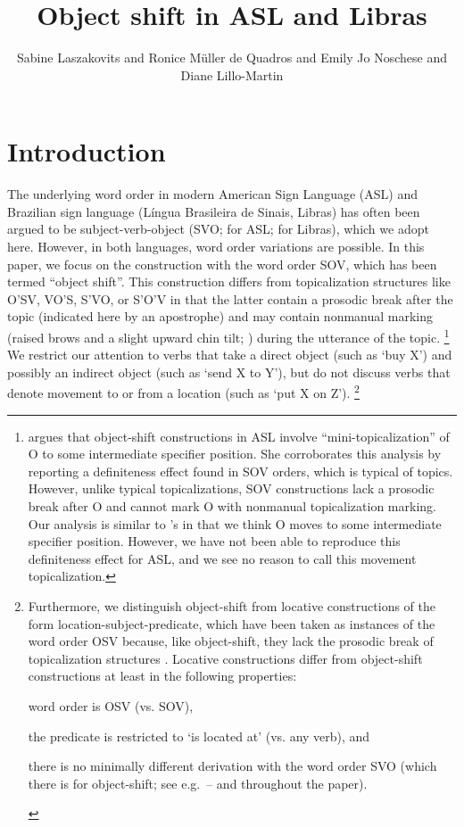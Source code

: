 \documentclass[output=paper,colorlinks,citecolor=brown,
]{langscibook}
\author{
    Sabine Laszakovits\affiliation{University of Connecticut; Austrian Academy of Sciences} and
    Ronice Müller de Quadros\affiliation{Universidade Federal de Santa Catarina} and 
    {Emily Jo} Noschese\affiliation{University of Hawai'i} and 
    Diane Lillo-Martin\affiliation{University of Connecticut; Haskins Laboratories}
}
\title{Object shift in ASL and Libras}
\begin{document}
\maketitle

\section{Introduction}

The underlying word order in modern American Sign Language (ASL)
and Brazilian sign language (Língua Brasileira de Sinais, Libras) has
often been argued to be subject-verb-object (SVO; 
\citealp[see]{Fischer.1975,Liddell.1980,Padden.1988} for ASL; 
\citealp{Quadros.1999,Quadros.2003} for Libras), 
which we adopt here. However, in both languages, word order
variations are possible. In this paper, we focus on the construction with
the word order SOV, which has been termed ``object shift''. This
construction differs from topicalization structures like O'SV, VO'S,
S'VO, or S'O'V in that the latter contain a prosodic break after the
topic (indicated here by an apostrophe) and may contain nonmanual
marking (raised brows and a slight upward chin tilt; 
\citealp{Liddell.1977,Liddell.1980,Padden.1988}) during the utterance of the topic.%
\footnote{
    \citet{Fischer.1990} argues that object-shift constructions in ASL involve
    ``mini-topicalization'' of O to some intermediate specifier position. She corroborates
    this analysis by reporting a definiteness effect found in SOV orders, which is typical
    of topics. However, unlike typical topicalizations, SOV constructions lack a prosodic
    break after O and cannot mark O with nonmanual topicalization marking. Our
    analysis is similar to \citeauthor{Fischer.1990}'s in that we think O moves to some intermediate
    specifier position. However, we have not been able to reproduce this definiteness
    effect for ASL, and we see no reason to call this movement topicalization.
}
We restrict our attention to verbs that take a direct object (such as `buy X') and
possibly an indirect object (such as `send X to Y'), but do not discuss
verbs that denote movement to or from a location (such as `put X on Z').%
\footnote{
    Furthermore, we distinguish object-shift from locative constructions of the
    form location-subject-predicate, which have been taken as instances of the word
    order OSV because, like object-shift, they lack the prosodic break of topicalization
    structures \citep{Liddell.1980}. Locative constructions differ from object-shift
    constructions at least in the following properties: 
    \begin{inparaenum}[(i)]
        \item word order is OSV (vs. SOV),
        \item the predicate is restricted to `is located at' (vs. any verb), and 
        \item there is no minimally different derivation with the word order SVO (which there is for
    object-shift; see e.g.~-- and throughout the paper).
    \end{inparaenum}
}
\end{document}
